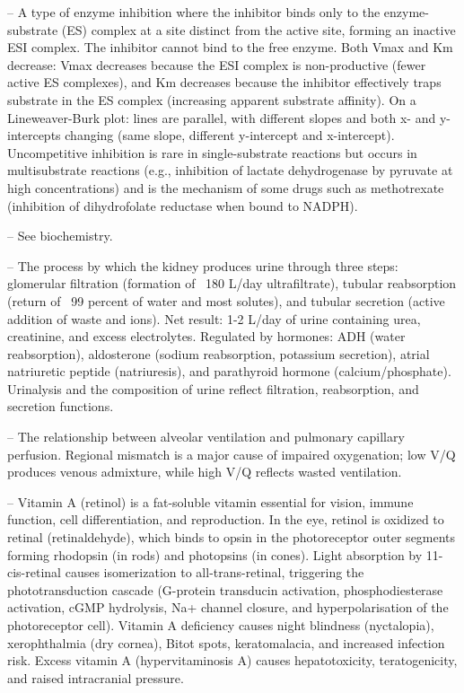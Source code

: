 -- A type of enzyme inhibition where the inhibitor binds only to the enzyme-substrate (ES) complex at a site distinct from the active site, forming an inactive ESI complex. The inhibitor cannot bind to the free enzyme. Both Vmax and Km decrease: Vmax decreases because the ESI complex is non-productive (fewer active ES complexes), and Km decreases because the inhibitor effectively traps substrate in the ES complex (increasing apparent substrate affinity). On a Lineweaver-Burk plot: lines are parallel, with different slopes and both x- and y-intercepts changing (same slope, different y-intercept and x-intercept). Uncompetitive inhibition is rare in single-substrate reactions but occurs in multisubstrate reactions (e.g., inhibition of lactate dehydrogenase by pyruvate at high concentrations) and is the mechanism of some drugs such as methotrexate (inhibition of dihydrofolate reductase when bound to NADPH).

-- See biochemistry.

-- The process by which the kidney produces urine through three steps: glomerular filtration (formation of ~180 L/day ultrafiltrate), tubular reabsorption (return of ~99 percent of water and most solutes), and tubular secretion (active addition of waste and ions). Net result: 1-2 L/day of urine containing urea, creatinine, and excess electrolytes. Regulated by hormones: ADH (water reabsorption), aldosterone (sodium reabsorption, potassium secretion), atrial natriuretic peptide (natriuresis), and parathyroid hormone (calcium/phosphate). Urinalysis and the composition of urine reflect filtration, reabsorption, and secretion functions.

-- The relationship between alveolar ventilation and pulmonary capillary perfusion. Regional mismatch is a major cause of impaired oxygenation; low V/Q produces venous admixture, while high V/Q reflects wasted ventilation.

-- Vitamin A (retinol) is a fat-soluble vitamin essential for vision, immune function, cell differentiation, and reproduction. In the eye, retinol is oxidized to retinal (retinaldehyde), which binds to opsin in the photoreceptor outer segments forming rhodopsin (in rods) and photopsins (in cones). Light absorption by 11-cis-retinal causes isomerization to all-trans-retinal, triggering the phototransduction cascade (G-protein transducin activation, phosphodiesterase activation, cGMP hydrolysis, Na+ channel closure, and hyperpolarisation of the photoreceptor cell). Vitamin A deficiency causes night blindness (nyctalopia), xerophthalmia (dry cornea), Bitot spots, keratomalacia, and increased infection risk. Excess vitamin A (hypervitaminosis A) causes hepatotoxicity, teratogenicity, and raised intracranial pressure.

